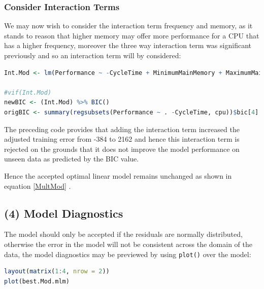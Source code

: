 \documentclass[
]{article}
\newcommand{\passthrough}[1]{#1}
\begin{document}
\hypertarget{consider-interaction-terms}{%
\subsubsection{Consider Interaction
Terms}\label{consider-interaction-terms}}

We may now wish to consider the interaction term frequency and memory,
as it stands to reason that higher memory may offer more performance for
a CPU that has a higher frequency, moreover the three way interaction
term was significant previously and so an interaction term will by
considered:

\begin{lstlisting}[language=R]
Int.Mod <- lm(Performance ~ -CycleTime + MinimumMainMemory + MaximumMainMemory + CacheSize + MaximumNumberOfChannels + MaximumMainMemory:Frequency:MaximumNumberOfChannels, data = cpu)

#vif(Int.Mod)
newBIC <- (Int.Mod) %>% BIC()
origBIC <- summary(regsubsets(Performance ~ . -CycleTime, cpu))$bic[4]
\end{lstlisting}

The preceding code provides that adding the interaction term increased the adjusted training error from
-384 to 2162 and hence this interaction term is rejected
on the grounds that it does not improve the model performance on unseen
data as predicted by the BIC value.

Hence the accepted optimal linear model remains unchanged as shown in equation \eqref{MultMod} .

\hypertarget{d-model-diagnostics}{%
\subsection{(4) Model Diagnostics}\label{d-model-diagnostics}}

The model should only be accepted if the residuals are normally
distributed, otherwise the error in the model will not be consistent
across the domain of the data, the model diagnostics may be previewed by
using \passthrough{\lstinline!plot()!} over the model:

\begin{lstlisting}[language=R]
layout(matrix(1:4, nrow = 2))
plot(best.Mod.mlm)
\end{lstlisting}
\end{document}

